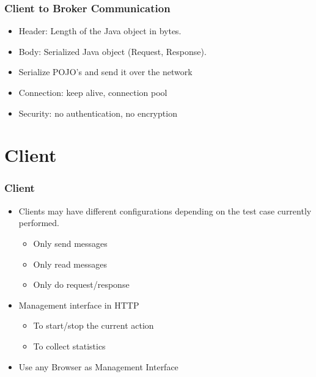 \documentclass{beamer}
\begin{document}
\begin{frame}
\frametitle{Client to Broker Communication}

\begin{itemize}
\item Header: Length of the Java object in bytes.
\item Body: Serialized Java object (Request, Response).
\item Serialize POJO's and send it over the network
\item Connection: keep alive, connection pool
\item Security: no authentication, no encryption
\end{itemize}
\end{frame}



\section{Client}
\begin{frame}
\frametitle{Client}
\begin{itemize}
\item Clients may have different configurations depending on the test case currently performed.
\begin{itemize}
\item{Only send messages}
\item{Only read messages}
\item{Only do request/response}
\end{itemize}

\item Management interface in HTTP
\begin{itemize}
\item{To start/stop the current action}
\item{To collect statistics}
\end{itemize}
\item Use any Browser as Management Interface
\end{itemize}
\end{frame}
\end{document}
